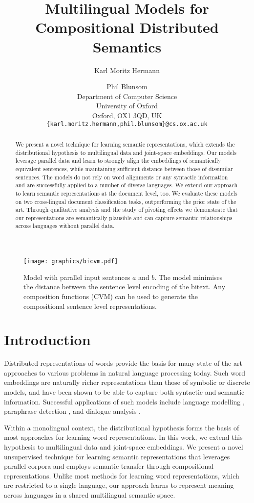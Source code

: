 \documentclass[11pt]{article}
\title{Multilingual Models for Compositional Distributed Semantics}
\author{Karl Moritz Hermann \and Phil Blunsom\\
 Department of Computer Science\\
 University of Oxford\\
 Oxford, OX1 3QD, UK\\
 {\tt \{karl.moritz.hermann,phil.blunsom\}@cs.ox.ac.uk}}
\date{}
\newcommand{\CVM}{\textsc{CVM}\xspace}
\begin{document}
\maketitle
\begin{abstract}
We present a novel technique for learning semantic representations, which
extends the distributional hypothesis to multilingual data and joint-space
embeddings. Our models leverage parallel data and learn to strongly align the
embeddings of semantically equivalent sentences, while maintaining sufficient
distance between those of dissimilar sentences. The models do not rely on
word alignments or any syntactic information and are successfully applied to a
number of diverse languages. We extend our approach to learn semantic
representations at the document level, too. We evaluate these models on two cross-lingual
document classification tasks, outperforming the prior state of the art.
Through qualitative analysis and the study of pivoting effects we demonstrate
that our representations are semantically plausible and can capture semantic
relationships across languages without parallel data.
\end{abstract}

\begin{figure}[t]
  \centering
  \captionsetup{font=small}
  \texttt{[image: graphics/bicvm.pdf]}
  \caption{Model with parallel input sentences $a$ and $b$. The model
    minimises the distance between the sentence level encoding of the bitext.
    Any composition functions (\CVM) can be used to generate the
    compositional sentence level representations.
    }\label{fig:bilingual}
  \vspace{-1em}
\end{figure}
\section{Introduction}

Distributed representations of words provide the basis for many state-of-the-art
approaches to various problems in natural language processing today. Such word
embeddings are naturally richer representations than those of symbolic or
discrete models, and have been shown to be able to capture both syntactic and
semantic information. Successful applications of such models include language
modelling \cite{Bengio:2003}, paraphrase detection \cite{Erk:2008}, and dialogue
analysis \cite{Kalchbrenner:2013}.

Within a monolingual context, the distributional hypothesis \cite{Firth:1957}
forms the basis of most approaches for learning word representations. In this
work, we extend this hypothesis to multilingual data and joint-space embeddings.
We present a novel unsupervised technique for learning semantic
representations that leverages parallel corpora and employs semantic transfer
through compositional representations. Unlike most methods for learning word
representations, which are restricted to a single language, our approach learns to
represent meaning across languages in a shared multilingual semantic space.
\end{document}
